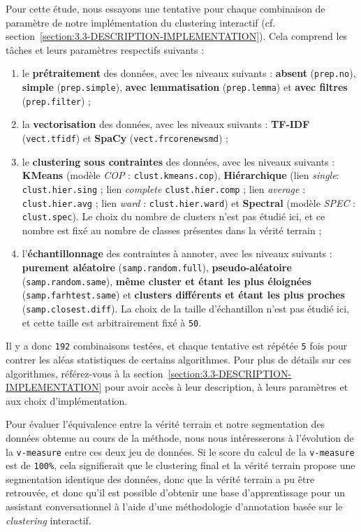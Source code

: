 			Pour cette étude, nous essayons une tentative pour chaque combinaison de paramètre de notre implémentation du clustering interactif (cf. section~\ref{section:3.3-DESCRIPTION-IMPLEMENTATION}). Cela comprend les tâches et leurs paramètres respectifs suivants :
			\begin{enumerate}
				\item le \textbf{prétraitement} des données, avec les niveaux suivants : \textbf{absent} (\texttt{prep.no}), \textbf{simple} (\texttt{prep.simple}), \textbf{avec lemmatisation} (\texttt{prep.lemma}) et \textbf{avec filtres} (\texttt{prep.filter}) ;
				\item la \textbf{vectorisation} des données, avec les niveaux suivants : \textbf{TF-IDF} (\texttt{vect.tfidf}) et \textbf{SpaCy} (\texttt{vect.frcorenewsmd}) ;
				\item le \textbf{clustering sous contraintes} des données, avec les niveaux suivants : \textbf{KMeans} (modèle \textit{COP} : \texttt{clust.kmeans.cop}), \textbf{Hiérarchique} (lien \textit{single}: \texttt{clust.hier.sing} ; lien \textit{complete} \texttt{clust.hier.comp} ; lien \textit{average} : \texttt{clust.hier.avg} ; lien \textit{ward} : \texttt{clust.hier.ward}) et \textbf{Spectral} (modèle \textit{SPEC} : \texttt{clust.spec}). Le choix du nombre de clusters n'est pas étudié ici, et ce nombre est fixé au nombre de classes présentes dans la vérité terrain ;
				\item l'\textbf{échantillonnage} des contraintes à annoter, avec les niveaux suivants : \textbf{purement aléatoire} (\texttt{samp.random.full}), \textbf{pseudo-aléatoire} (\texttt{samp.random.same}), \textbf{même cluster et étant les plus éloignées} (\texttt{samp.farhtest.same}) et \textbf{clusters différents et étant les plus proches} (\texttt{samp.closest.diff}). La choix de la taille d'échantillon n'est pas étudié ici, et cette taille est arbitrairement fixé à \texttt{50}.
			\end{enumerate}
			
			Il y a donc \texttt{192} combinaisons testées, et chaque tentative est répétée \texttt{5} fois pour contrer les aléas statistiques de certains algorithmes.
			Pour plus de détails sur ces algorithmes, référez-vous à la section~\ref{section:3.3-DESCRIPTION-IMPLEMENTATION} pour avoir accès à leur description, à leurs paramètres et aux choix d'implémentation.
			
			Pour évaluer l'équivalence entre la vérité terrain et notre segmentation des données obtenue au cours de la méthode, nous nous intéresserons à l'évolution de la \texttt{v-measure} entre ces deux jeu de données.
			Si le score du calcul de la \texttt{v-measure} est de \texttt{100\%}, cela signifierait que le clustering final et la vérité terrain propose une segmentation identique des données, donc que la vérité terrain a pu être retrouvée, et donc qu'il est possible d'obtenir une base d'apprentissage pour un assistant conversationnel à l'aide d'une méthodologie d'annotation basée sur le \textit{clustering} interactif.
			
